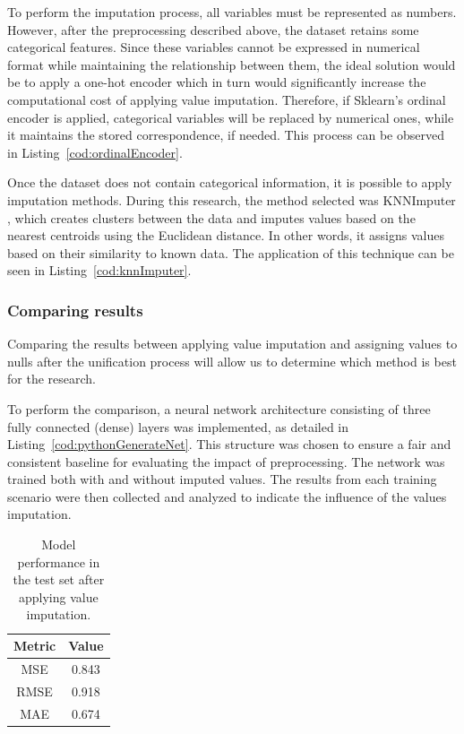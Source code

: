 To perform the imputation process, all variables must be represented as numbers. However, after the preprocessing described above, the dataset retains some categorical features. Since these variables cannot be expressed in numerical format while maintaining the relationship between them, the ideal solution would be to apply a one-hot encoder which in turn would significantly increase the computational cost of applying value imputation. Therefore, if Sklearn's ordinal encoder \cite{scikit-learn-ordinalencoder} is applied, categorical variables will be replaced by numerical ones, while it maintains the stored correspondence, if needed. This process can be observed in Listing~\ref{cod:ordinalEncoder}.

Once the dataset does not contain categorical information, it is possible to apply imputation methods. During this research, the method selected was KNNImputer \cite{scikit-learn-knnimputer}, which creates clusters between the data and imputes values based on the nearest centroids using the Euclidean distance. In other words, it assigns values based on their similarity to known data. The application of this technique can be seen in Listing~\ref{cod:knnImputer}.

\subsubsection{Comparing results}

Comparing the results between applying value imputation and assigning values to nulls after the unification process will allow us to determine which method is best for the research.

To perform the comparison, a neural network architecture consisting of three fully connected (dense) layers was implemented, as detailed in Listing~\ref{cod:pythonGenerateNet}. This structure was chosen to ensure a fair and consistent baseline for evaluating the impact of preprocessing. The network was trained both with and without imputed values. The results from each training scenario were then collected and analyzed to indicate the influence of the values imputation.

\begin{table}[H]
    \centering
    \begin{tabular}{|c|c|}
    \hline
    \textbf{Metric} & \textbf{Value} \\
    \hline
    MSE  & 0.843 \\
    RMSE & 0.918 \\
    MAE  & 0.674 \\
    \hline
    \end{tabular}
    \caption{Model performance in the test set after applying value imputation.}
    \label{tab:model_metrics_imputing_values}
\end{table}

